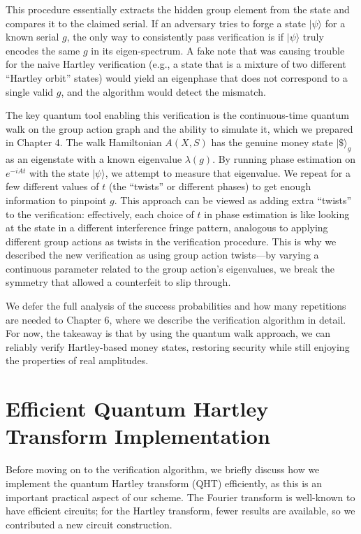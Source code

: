 \documentclass[12pt]{report}
\begin{document}
This procedure essentially extracts the hidden group element from the state and compares it to the claimed serial. If an adversary tries to forge a state $|\psi\rangle$ for a known serial $g$, the only way to consistently pass verification is if $|\psi\rangle$ truly encodes the same $g$ in its eigen-spectrum. A fake note that was causing trouble for the naive Hartley verification (e.g., a state that is a mixture of two different “Hartley orbit” states) would yield an eigenphase that does not correspond to a single valid $g$, and the algorithm would detect the mismatch.

The key quantum tool enabling this verification is the continuous-time quantum walk on the group action graph and the ability to simulate it, which we prepared in Chapter 4. The walk Hamiltonian $A(X,S)$ has the genuine money state $|\$\rangle_g$ as an eigenstate with a known eigenvalue $\lambda(g)$. By running phase estimation on $e^{-iA t}$ with the state $|\psi\rangle$, we attempt to measure that eigenvalue. We repeat for a few different values of $t$ (the “twists” or different phases) to get enough information to pinpoint $g$. This approach can be viewed as adding extra “twists” to the verification: effectively, each choice of $t$ in phase estimation is like looking at the state in a different interference fringe pattern, analogous to applying different group actions as twists in the verification procedure. This is why we described the new verification as using group action twists—by varying a continuous parameter related to the group action’s eigenvalues, we break the symmetry that allowed a counterfeit to slip through.

We defer the full analysis of the success probabilities and how many repetitions are needed to Chapter 6, where we describe the verification algorithm in detail. For now, the takeaway is that by using the quantum walk approach, we can reliably verify Hartley-based money states, restoring security while still enjoying the properties of real amplitudes.

\section{Efficient Quantum Hartley Transform Implementation}
Before moving on to the verification algorithm, we briefly discuss how we implement the quantum Hartley transform (QHT) efficiently, as this is an important practical aspect of our scheme. The Fourier transform is well-known to have efficient circuits; for the Hartley transform, fewer results are available, so we contributed a new circuit construction.
\end{document}
